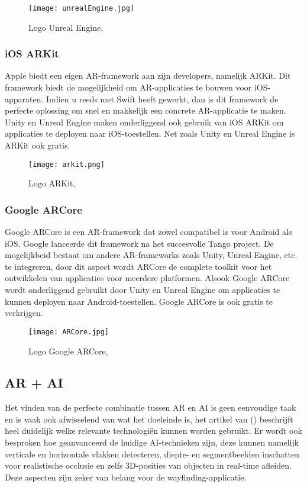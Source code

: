 \begin{figure}[H]
	\centering
	\texttt{[image: unrealEngine.jpg]}
	\caption{Logo Unreal Engine, \autocite{UnrealEngine2019}}
\end{figure}

\subsubsection{iOS ARKit}
Apple biedt een eigen AR-framework aan zijn developers, namelijk ARKit. Dit framework biedt de mogelijkheid om AR-applicaties te bouwen voor iOS-apparaten. Indien u reeds met Swift heeft gewerkt, dan is dit framework de perfecte oplossing om snel en makkelijk een concrete AR-applicatie te maken. Unity en Unreal Engine maken onderliggend ook gebruik van iOS ARKit om applicaties te deployen naar iOS-toestellen. Net zoals Unity en Unreal Engine is ARKit ook gratis.
\begin{figure}[H]
	\centering
	\texttt{[image: arkit.png]}
	\caption{Logo ARKit, \autocite{Apple2019}}
\end{figure}

\subsubsection{Google ARCore}
Google ARCore is een AR-framework dat zowel compatibel is voor Android als iOS. Google lanceerde dit framework na het succesvolle Tango project.
De mogelijkbeid bestaat om andere AR-frameworks zoals Unity, Unreal Engine, etc.  te integreren, door dit aspect wordt ARCore de complete toolkit voor het ontwikkelen van applicaties voor meerdere platformen. Alsook Google ARCore wordt onderliggend gebruikt door Unity en Unreal Engine om applicaties te kunnen deployen naar Android-toestellen. Google ARCore is ook gratis te verkrijgen.

\begin{figure}[H]
	\centering
	\texttt{[image: ARCore.jpg]}
	\caption{Logo Google ARCore, \autocite{ARCore2019}}
\end{figure}

\subsection{AR + AI}
Het vinden van de perfecte combinatie tussen AR en AI is geen eenvoudige taak en is vaak ook afwisselend van wat het doeleinde is, het artikel van \textcite{Toole2019} () beschrijft heel duidelijk welke relevante technologiën kunnen worden gebruikt. Er wordt ook besproken hoe geanvanceerd de huidige AI-technieken zijn, deze kunnen namelijk  verticale en horizontale vlakken detecteren, diepte- en segmentbeelden inschatten voor realistische occlusie en zelfs 3D-posities van objecten in real-time afleiden. Deze aspecten zijn zeker van belang voor de wayfinding-applicatie.

